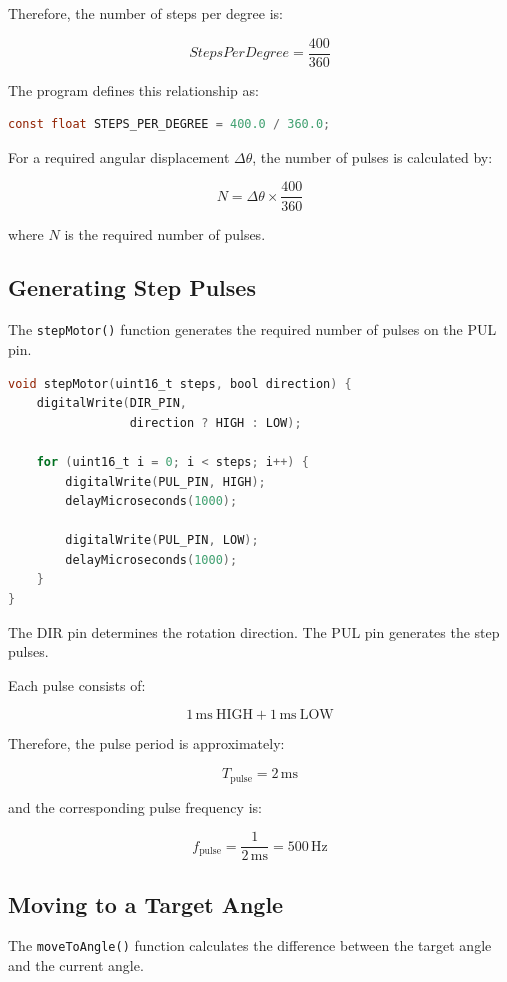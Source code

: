 \documentclass[12pt,a4paper]{article}
\begin{document}
Therefore, the number of steps per degree is:

\[
StepsPerDegree
=
\frac{400}{360}
\]

The program defines this relationship as:

\begin{lstlisting}[language=C]
const float STEPS_PER_DEGREE = 400.0 / 360.0;
\end{lstlisting}

For a required angular displacement $\Delta\theta$, the number of
pulses is calculated by:

\[
N
=
\Delta\theta
\times
\frac{400}{360}
\]

where $N$ is the required number of pulses.

\subsection{Generating Step Pulses}

The \texttt{stepMotor()} function generates the required number of
pulses on the PUL pin.

\begin{lstlisting}[language=C]
void stepMotor(uint16_t steps, bool direction) {
    digitalWrite(DIR_PIN,
                 direction ? HIGH : LOW);

    for (uint16_t i = 0; i < steps; i++) {
        digitalWrite(PUL_PIN, HIGH);
        delayMicroseconds(1000);

        digitalWrite(PUL_PIN, LOW);
        delayMicroseconds(1000);
    }
}
\end{lstlisting}

The DIR pin determines the rotation direction. The PUL pin generates
the step pulses.

Each pulse consists of:

\[
1\,\mathrm{ms}\ \mathrm{HIGH}
+
1\,\mathrm{ms}\ \mathrm{LOW}
\]

Therefore, the pulse period is approximately:

\[
T_{\mathrm{pulse}}
=
2\,\mathrm{ms}
\]

and the corresponding pulse frequency is:

\[
f_{\mathrm{pulse}}
=
\frac{1}{2\,\mathrm{ms}}
=
500\,\mathrm{Hz}
\]

\subsection{Moving to a Target Angle}

The \texttt{moveToAngle()} function calculates the difference between
the target angle and the current angle.
\end{document}
